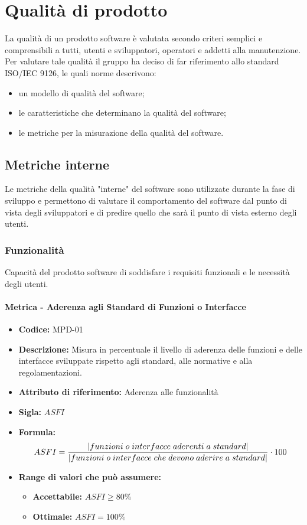 \section{Qualità di prodotto}
La qualità di un prodotto software è valutata secondo criteri semplici e comprensibili a tutti, utenti e sviluppatori, operatori e addetti alla manutenzione.
Per valutare tale qualità il gruppo \Gruppo{} ha deciso di far riferimento allo standard ISO/IEC 9126, le quali norme descrivono:
\begin{itemize}
    \item un modello di qualità del software; 
    \item le caratteristiche che determinano la qualità del software;
    \item le metriche per la misurazione della qualità del software.
\end{itemize}

\subsection{Metriche interne}
Le metriche della qualità "interne" del software sono utilizzate durante la fase di sviluppo e permettono di valutare il comportamento del software dal punto di vista degli sviluppatori e di predire quello che sarà il punto di vista esterno degli utenti.

\subsubsection{Funzionalità}
Capacità del prodotto software di soddisfare i requisiti funzionali e le necessità degli utenti.
\paragraph{Metrica - Aderenza agli Standard di Funzioni o Interfacce} 
\begin{itemize}
    \item \textbf{Codice:} MPD-01
    \item \textbf{Descrizione:} Misura in percentuale il livello di aderenza delle funzioni e delle interfacce sviluppate rispetto agli standard, alle normative e alla regolamentazioni.
    \item \textbf{Attributo di riferimento:} Aderenza alle funzionalità 
    \item \textbf{Sigla:} $ASFI$
    \item \textbf{Formula:} $$ASFI = {|funzioni \; o \; interfacce \; aderenti \; a \; standard| \over |funzioni \; o \; interfacce \; che \; devono \; aderire \; a \; standard|} \cdot 100 $$
    \item \textbf{Range di valori che può assumere:}
    \begin{itemize}
        \item \textbf{Accettabile:} $ASFI \geq 80\% $
        \item \textbf{Ottimale:} $ASFI = 100\%$
    \end{itemize}
\end{itemize}
              
